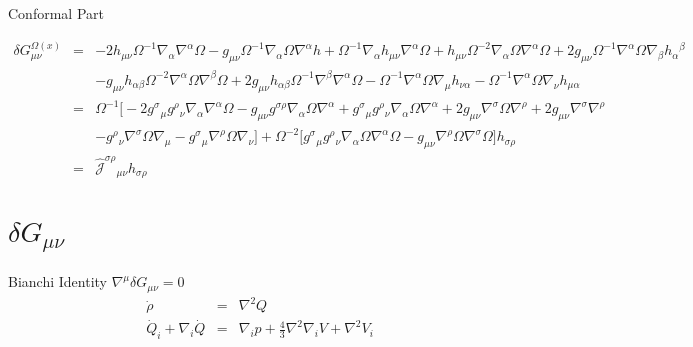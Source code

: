 \documentclass[10pt,letterpaper]{article}
\numberwithin{equation}{section}
\begin{document}

Conformal Part

\begin{eqnarray}
\delta G^{\Omega(x)}_{\mu\nu} &=& 
-2 h_{\mu \nu} \Omega^{-1} \nabla_{\alpha}\nabla^{\alpha}\Omega -  g_{\mu \nu} \Omega^{-1} \nabla_{\alpha}\Omega \nabla^{\alpha}h + \Omega^{-1} \nabla_{\alpha}h_{\mu \nu} \nabla^{\alpha}\Omega + h_{\mu \nu} \Omega^{-2} \nabla_{\alpha}\Omega \nabla^{\alpha}\Omega + 2 g_{\mu \nu} \Omega^{-1} \nabla^{\alpha}\Omega \nabla_{\beta}h_{\alpha}{}^{\beta}
\nonumber\\
&&
 -  g_{\mu \nu} h_{\alpha \beta} \Omega^{-2} \nabla^{\alpha}\Omega \nabla^{\beta}\Omega 
+ 2 g_{\mu \nu} h_{\alpha \beta} \Omega^{-1} \nabla^{\beta}\nabla^{\alpha}\Omega -  \Omega^{-1} \nabla^{\alpha}\Omega \nabla_{\mu}h_{\nu \alpha} -  \Omega^{-1} \nabla^{\alpha}\Omega \nabla_{\nu}h_{\mu \alpha}
\nonumber\\
&=&
\Omega^{-1} \bigg[ -2 g^{\sigma}{}_\mu g^\rho{}_\nu \nabla_\alpha \nabla^\alpha \Omega - g_{\mu\nu}g^{\sigma\rho}\nabla_\alpha \Omega \nabla^\alpha + g^{\sigma}{}_\mu g^\rho{}_\nu \nabla_\alpha \Omega \nabla^\alpha 
+ 2 g_{\mu\nu} \nabla^\sigma \Omega \nabla^\rho + 2 g_{\mu\nu} \nabla^\sigma \nabla^\rho 
\nonumber\\
&&
- g^{\rho}{}_\nu \nabla^\sigma \Omega \nabla_\mu - g^{\sigma}{}_\mu \nabla^\rho \Omega \nabla_\nu\bigg]
+ \Omega^{-2}\bigg[  g^{\sigma}{}_\mu g^\rho{}_\nu \nabla_\alpha\Omega \nabla^\alpha\Omega
- g_{\mu\nu} \nabla^\rho \Omega\nabla^\sigma\Omega \bigg] h_{\sigma\rho}
\nonumber\\
&=& \mathcal{\hat J}^{\sigma\rho}{}_{\mu\nu} h_{\sigma\rho}
\end{eqnarray}

\newpage
\section{$\delta G_{\mu\nu}$}
Bianchi Identity $\nabla^\mu \delta G_{\mu\nu} = 0$
\begin{eqnarray}
\dot \rho &=& \nabla^2 Q
\nonumber\\
\dot Q_i + \nabla_i \dot Q &=& \nabla_i p + \tfrac43 \nabla^2 \nabla_i V + \nabla^2 V_i
\end{eqnarray}
\end{document}
